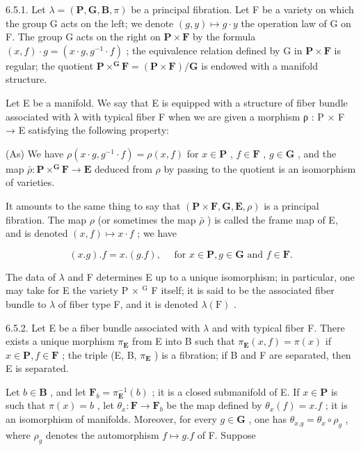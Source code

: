 6.5.1. Let \(\lambda = (\mathbf{P}, \mathbf{G}, \mathbf{B}, \pi)\) be a principal fibration. Let F be a variety on which the group G acts on the left; we denote \((g, y) \mapsto g \cdot y\) the operation law of G on F. The group G acts on the right on \(\mathbf{P} \times \mathbf{F}\) by the formula \((x, f) \cdot g = (x \cdot g, g^{-1} \cdot f)\) ; the equivalence relation defined by G in \(\mathbf{P} \times \mathbf{F}\) is regular; the quotient \(\mathbf{P} \times^{\mathbf{G}}\mathbf{F} = (\mathbf{P} \times \mathbf{F}) / \mathbf{G}\) is endowed with a manifold structure.

Let E be a manifold. We say that E is equipped with a structure of fiber bundle associated with λ with typical fiber F when we are given a morphism ρ : P × F → E satisfying the following property:

(As) We have \(\rho(x \cdot g,g^{-1} \cdot f)=\rho(x,f)\) for \(x\in\mathbf{P}\) , \(f\in\mathbf{F}\) , \(g\in\mathbf{G}\) , and the map \(\bar{\rho}:\mathbf{P}\times^{\mathbf{G}}\mathbf{F}\to\mathbf{E}\) deduced from \(\rho\) by passing to the quotient is an isomorphism of varieties.

It amounts to the same thing to say that \((\mathbf{P} \times \mathbf{F}, \mathbf{G}, \mathbf{E}, \rho)\) is a principal fibration. The map \(\rho\) (or sometimes the map \(\bar{\rho}\) ) is called the frame map of E, and is denoted \((x, f) \mapsto x \cdot f\) ; we have

\[
(x. g). f = x. (g. f), \quad \text {   for   } x \in \mathbf {P}, g \in \mathbf {G} \text {   and   } f \in \mathbf {F}.
\]

The data of \(\lambda\) and F determines E up to a unique isomorphism; in particular, one may take for E the variety P × \(^{\text{G}}\) F itself; it is said to be the associated fiber bundle to \(\lambda\) of fiber type F, and it is denoted \(\lambda(\text{F})\) .

6.5.2. Let E be a fiber bundle associated with \(\lambda\) and with typical fiber F. There exists a unique morphism \(\pi_{\mathbf{E}}\) from E into B such that \(\pi_{\mathbf{E}}(x,f)=\pi(x)\) if \(x\in\mathbf{P},f\in\mathbf{F}\) ; the triple (E, B, \(\pi_{\mathbf{E}}\) ) is a fibration; if B and F are separated, then E is separated.

Let \(b \in \mathbf{B}\) , and let \(\mathbf{F}_b = \pi_{\mathbf{E}}^{-1}(b)\) ; it is a closed submanifold of E. If \(x \in \mathbf{P}\) is such that \(\pi(x) = b\) , let \(\theta_x: \mathbf{F} \to \mathbf{F}_b\) be the map defined by \(\theta_x(f) = x.f\) ; it is an isomorphism of manifolds. Moreover, for every \(g \in \mathbf{G}\) , one has \(\theta_{x.g} = \theta_x \circ \rho_g\) , where \(\rho_g\) denotes the automorphism \(f \mapsto g.f\) of F. Suppose

